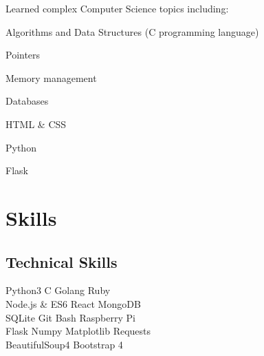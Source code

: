 \documentclass[]{deedy-resume-openfont}
\begin{document}
\begin{minipage}[t]{0.33\textwidth}
    Learned complex Computer Science topics including: \\
    \begin{tightemize}
        \item Algorithms and Data Structures (C programming language)
        \item Pointers
        \item Memory management
        \item Databases
        \item HTML \& CSS
        \item Python
        \item Flask
    \end{tightemize}
    \sectionsep



    \section{Skills}
    \subsection{Technical Skills}
    Python3 \textbullet{}   C \textbullet{} Golang \textbullet{}
    Ruby \\
    Node.js \& ES6 \textbullet{} React
    \textbullet{} MongoDB \\
    SQLite \textbullet{}
    Git \textbullet{} Bash \textbullet{}
    Raspberry Pi \\
    \vspace{\topsep} %
    Flask \textbullet{} Numpy \textbullet{} Matplotlib \textbullet{} Requests \\ BeautifulSoup4 \textbullet{} Bootstrap 4 \\
    \sectionsep


\end{minipage}
\end{document}
